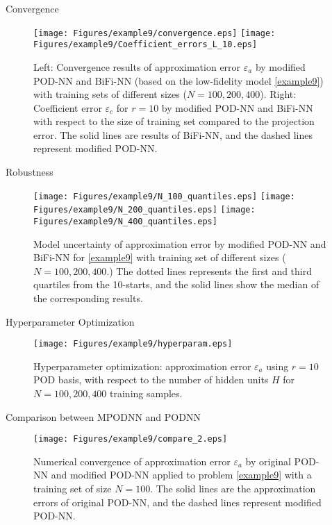 \documentclass[10pt]{beamer}
\begin{document}
\begin{frame}{Convergence}
\begin{figure}[htbp]
\centering
\vbox{
\texttt{[image: Figures/example9/convergence.eps]}
\texttt{[image: Figures/example9/Coefficient\_errors\_L\_10.eps]}
}
\caption{Left: Convergence results of approximation error $\varepsilon_a$ by modified POD-NN and BiFi-NN (based on the low-fidelity model \eqref{example9}) with training sets of different sizes ($N=100,200,400$). Right: Coefficient error $\varepsilon_c$ for $r = 10$ by modified POD-NN and BiFi-NN with respect to the size of training set compared to the projection error. The solid lines are results of BiFi-NN, and the dashed lines represent modified POD-NN.}
\label{example_epfl-errors}
\end{figure}
\end{frame}

\begin{frame}{Robustness}
\begin{figure}[ht]
    \centering
    \vbox{
    \texttt{[image: Figures/example9/N\_100\_quantiles.eps]}
    \texttt{[image: Figures/example9/N\_200\_quantiles.eps]}
    \texttt{[image: Figures/example9/N\_400\_quantiles.eps]}
    }
    \caption{Model uncertainty of approximation error by modified POD-NN and BiFi-NN for \eqref{example9} with training set of different sizes ($N = 100, 200, 400$.) The dotted lines represents the first and third quartiles from the 10-starts, and the solid lines show the median of the corresponding results.}
    \label{example9-quantiles}
\end{figure}
\end{frame}

\begin{frame}{Hyperparameter Optimization}
\begin{figure}[htbp]
\centering
\vbox{
\texttt{[image: Figures/example9/hyperparam.eps]}
}
\caption{Hyperparameter optimization: approximation error $\varepsilon_a$ using $r = 10 $ POD basis, with respect to the number of hidden units $H$ for $N=100, 200, 400$ training samples.}
\label{example9-hyperopt}
\end{figure}
\end{frame}

\begin{frame}{Comparison between MPODNN and PODNN}
\begin{figure}[htbp]
    \centering
    \vbox{
    \texttt{[image: Figures/example9/compare\_2.eps]}
    }
    \caption{Numerical convergence of approximation error $\varepsilon_a$ by original  POD-NN and modified POD-NN applied to problem \eqref{example9} with a training set of size $N=100$. The solid lines are the approximation errors of original POD-NN, and the dashed lines represent modified POD-NN.}
    \label{example9-comparison}
\end{figure}
\end{frame}
\end{document}
